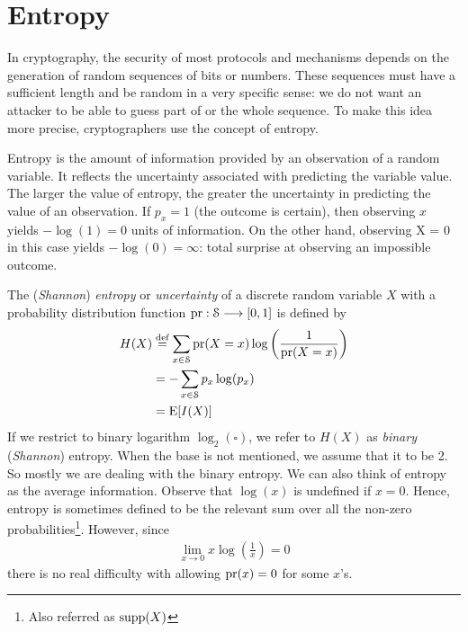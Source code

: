 \documentclass[a4paper, 12pt]{book} %
\begin{document}
\section{Entropy}

In cryptography, the security of most protocols and mechanisms depends on the generation of random sequences of bits or numbers. These sequences must have a sufficient length and be random in a very specific sense: we do not want an attacker to be able to guess part of or the whole sequence. To make this idea more precise, cryptographers use the concept of entropy.

Entropy is the amount of information provided by an observation of a random variable. It reflects the uncertainty associated with predicting the variable value. The larger the value of entropy, the greater the uncertainty in predicting the value of an observation. If $p_x = 1$ (the outcome is certain), then observing $x$ yields $-\log(1) = 0$ units of information. On the other hand, observing X = 0 in this case yields $-\log(0) = \infty$: total surprise at observing an impossible outcome.

\begin{definition}
    The (\emph{Shannon}) \emph{entropy} or \emph{uncertainty} of a discrete random variable $X$ with a probability distribution function $\operatorname{pr}: \EuScript{S} \longrightarrow [0,1]$ is defined by
    \begin{align}
        H(X) &\overset{\text{def}}{=} \sum_{x \in \EuScript{S}} \operatorname{pr}(X = x) \log\left( \frac{1}{\operatorname{pr}(X = x)} \right)  \\
        &= -\sum_{x \in \EuScript{S}} p_x \log(p_x) \\
        &= \mathrm{E}[I(X)] 
    \end{align}
    If we restrict to binary logarithm $\log_2(\square)$, we refer to $H(X)$ as \emph{binary} (\emph{Shannon}) entropy. When the base is not mentioned, we assume that it to be 2. So mostly we are dealing with the binary entropy. We can also think of entropy as the average information. Observe that $\log(x)$ is undefined if $x = 0$. Hence, entropy is sometimes defined to be the relevant sum over all the non-zero probabilities\footnote{Also referred as $\operatorname{supp}(X)$}. However, since
        \begin{align}
        \lim_{x \longrightarrow 0} x \log\left( \frac{1}{x} \right) = 0
    \end{align}
    there is no real difficulty with allowing $\operatorname{pr}(x) = 0$ for some $x$'s. 
\end{definition}
\end{document}
